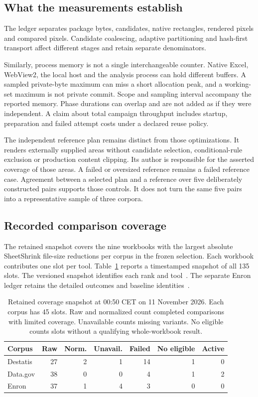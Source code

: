 \subsection{What the measurements establish}
The ledger separates package bytes, candidates, native rectangles, rendered
pixels and compared pixels. Candidate coalescing, adaptive partitioning and
hash-first transport affect different stages and retain separate denominators.

Similarly, process memory is not a single interchangeable counter. Native Excel,
WebView2, the local host and the analysis process can hold different buffers.
A sampled private-byte maximum can miss a short allocation peak, and a working-set
maximum is not private commit. Scope and sampling interval accompany the reported
memory. Phase durations can overlap and are not added as if they were independent.
A claim about total campaign throughput includes startup, preparation and failed
attempt costs under a declared reuse policy.

The independent reference plan remains distinct from those optimizations. It
renders externally supplied areas without candidate selection, conditional-rule
exclusion or production content clipping. Its author is responsible for the
asserted coverage of those areas. A failed or oversized reference remains a
failed reference case. Agreement between a selected plan and a reference over
five deliberately constructed pairs supports those controls. It does not turn
the same five pairs into a representative sample of three corpora.

\subsection{Recorded comparison coverage}
The retained snapshot covers the nine workbooks with the largest absolute
SheetShrink file-size reductions per corpus in the frozen selection.
Each workbook contributes one slot per tool. Table~\ref{tab:stage-coverage}
reports a timestamped snapshot of all 135 slots. The versioned snapshot
identifies each rank and tool~\cite{stagenearestcoverage}. The separate
Enron ledger retains the detailed outcomes and baseline identities~\cite{enronstagecoverage}.

\begin{table}[t]
\centering
\caption{Retained coverage snapshot at 00:50 CET on 11 November 2026. Each corpus
has 45 slots. Raw and normalized count completed comparisons with limited
coverage. Unavailable counts missing variants. No eligible counts slots
without a qualifying whole-workbook result.}
\label{tab:stage-coverage}
\setlength{\tabcolsep}{5pt}
\begin{tabular}{lrrrrrr}
\hline
Corpus & Raw & Norm. & Unavail. & Failed & No eligible & Active \\
\hline
Destatis & 27 & 2 & 1 & 14 & 1 & 0 \\
Data.gov & 38 & 0 & 0 & 4 & 1 & 2 \\
Enron & 37 & 1 & 4 & 3 & 0 & 0 \\
\hline
\end{tabular}
\end{table}

